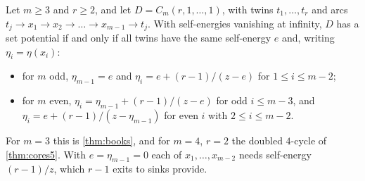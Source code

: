 \begin{theorem}\label{thm:one-blown}
Let $m\ge3$ and $r\ge2$, and let $D=C_m(r,1,\dots,1)$, with twins $t_1,\dots,t_r$ and arcs $t_j\to x_1\to x_2\to\dots\to x_{m-1}\to t_j$. With self-energies vanishing at infinity, $D$ has a set potential if and only if all twins have the same self-energy $e$ and, writing $\eta_i=\eta(x_i)$:
\begin{itemize}
\item for $m$ odd, $\eta_{m-1}=e$ and $\eta_i=e+(r-1)/(z-e)$ for $1\le i\le m-2$;
\item for $m$ even, $\eta_i=\eta_{m-1}+(r-1)/(z-e)$ for odd $i\le m-3$, and $\eta_i=e+(r-1)/(z-\eta_{m-1})$ for even $i$ with $2\le i\le m-2$.
\end{itemize}
For $m=3$ this is \cref{thm:books}, and for $m=4$, $r=2$ the doubled $4$-cycle of \cref{thm:cores5}. With $e=\eta_{m-1}=0$ each of $x_1,\dots,x_{m-2}$ needs self-energy $(r-1)/z$, which $r-1$ exits to sinks provide.
\end{theorem}
